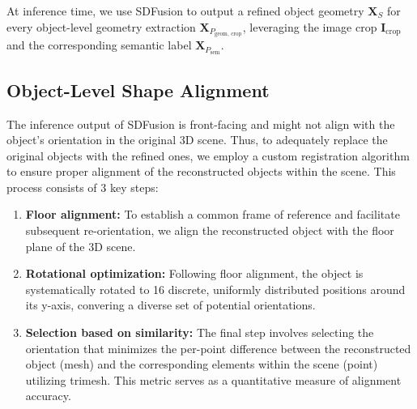 At inference time, we use SDFusion to output a refined object geometry $\mathbf{X}_S$ for every object-level geometry extraction $\mathbf{X}_{P_{\text{geom, crop}}}$, leveraging the image crop $\mathbf{I}_{\text{crop}}$ and the corresponding semantic label $\mathbf{X}_{P_{\text{sem}}}$.

\subsection{Object-Level Shape Alignment}
The inference output of SDFusion is front-facing and might not align with the object's orientation in the original 3D scene. Thus, to adequately replace the original objects with the refined ones, we employ a custom registration algorithm to ensure proper alignment of the reconstructed objects within the scene. This process consists of 3 key steps:
\begin{enumerate}
    \item \textbf{Floor alignment:} To establish a common frame of reference and facilitate subsequent re-orientation, we align the reconstructed object with the floor plane of the 3D scene.
    
    \item \textbf{Rotational optimization:} Following floor alignment, the object is systematically rotated to 16 discrete, uniformly distributed positions around its y-axis, convering a diverse set of potential orientations.
    
    \item \textbf{Selection based on similarity:} The final step involves selecting the orientation that minimizes the per-point difference between the reconstructed object (mesh) and the corresponding elements within the scene (point) utilizing trimesh. This metric serves as a quantitative measure of alignment accuracy.
\end{enumerate}
